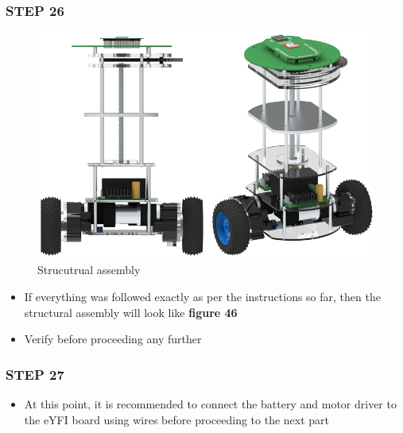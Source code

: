 \documentclass[12pt,a4paper,oneside]{book}
\begin{document}
			\subsubsection*{STEP 26}
				\begin{figure}[H]
					\begin{center}
						\includegraphics[scale=0.7]{STRUCTURE}
						\caption{Strucutrual assembly}
					\end{center}
				\end{figure}
				\begin{itemize}
					\item If everything was followed exactly as per the instructions so far, then the structural assembly will look like \textbf{figure 46}
					\item Verify before proceeding any further
				\end{itemize}
				\pagebreak
    
			\subsubsection*{STEP 27}
				\begin{itemize}
					\item At this point, it is recommended to connect the battery and motor driver to the eYFI board using wires before proceeding to the next part 
				\end{itemize}
				
\end{document}
